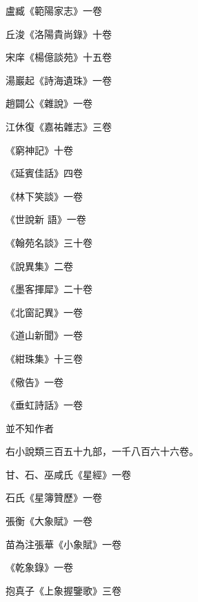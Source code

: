 \begin{pinyinscope}
 盧臧《範陽家志》一卷



 丘浚《洛陽貴尚錄》十卷



 宋庠《楊億談苑》十五卷



 湯巖起《詩海遺珠》一卷



 趙闢公《雜說》一卷



 江休復《嘉祐雜志》三卷



 《窮神記》十卷



 《延賓佳話》四卷



 《林下笑談》一卷



 《世說新
 語》一卷



 《翰苑名談》三十卷



 《說異集》二卷



 《墨客揮犀》二十卷



 《北窗記異》一卷



 《道山新聞》一卷



 《紺珠集》十三卷



 《儆告》一卷



 《垂虹詩話》一卷



 並不知作者



 右小說類三百五十九部，一千八百六十六卷。



 甘、石、巫咸氏《星經》一卷



 石氏《星簿贊歷》一卷



 張衡《大象賦》一卷



 苗為注張華《小象賦》一卷



 《乾象錄》一卷



 抱真子《上象握鑒歌》三卷




\end{pinyinscope}
